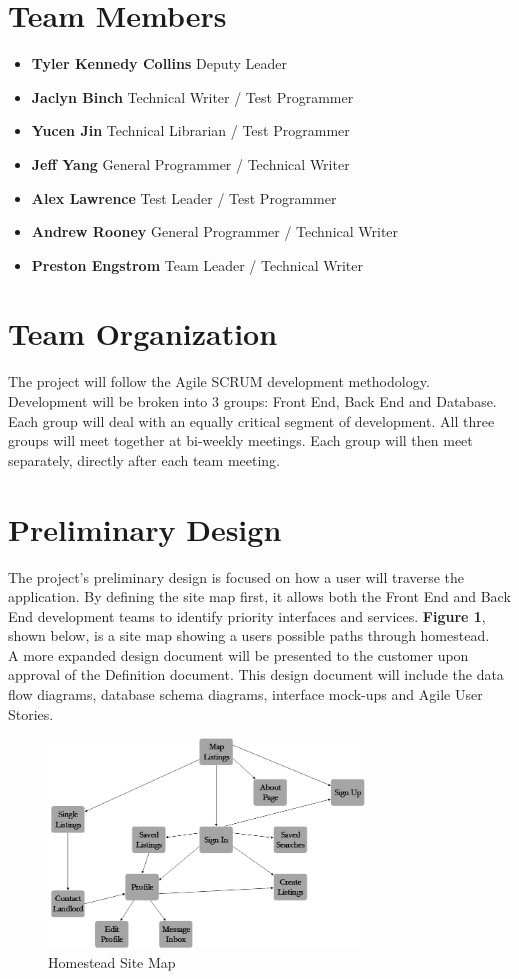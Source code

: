 \documentclass[14pt]{article}
\begin{document}
\section{Team Members}
\begin{itemize}
	\item \textbf{Tyler Kennedy Collins} Deputy Leader
	\item \textbf{Jaclyn Binch} Technical Writer / Test Programmer
	\item \textbf{Yucen Jin} Technical Librarian / Test Programmer
	\item \textbf{Jeff Yang} General Programmer / Technical Writer
	\item \textbf{Alex Lawrence} Test Leader / Test Programmer
	\item \textbf{Andrew Rooney} General Programmer / Technical Writer
	\item \textbf{Preston Engstrom} Team Leader / Technical Writer
\end{itemize}

\section{Team Organization}
The project will follow the Agile SCRUM development methodology. Development will be broken into 3 groups: Front End, Back End and Database. Each group will deal with an equally critical segment of development. All three groups will meet together at bi-weekly meetings. Each group will then meet separately, directly after each team meeting.

\section{Preliminary Design}
The project's preliminary design is focused on how a user will traverse the application. By defining the site map first, it allows both the Front End and Back End development teams to identify priority interfaces and services. \textbf{Figure 1}, shown below, is a site map showing a users possible paths through homestead.
\\A more expanded design document will be presented to the customer upon approval of the Definition document. This design document will include the data flow diagrams, database schema diagrams, interface mock-ups and Agile User Stories.


\begin{figure}[!ht]
	 \caption{Homestead Site Map}
	\includegraphics[width=0.75\textwidth]{Phase1SiteMap.png}
\end{figure}
\end{document}
